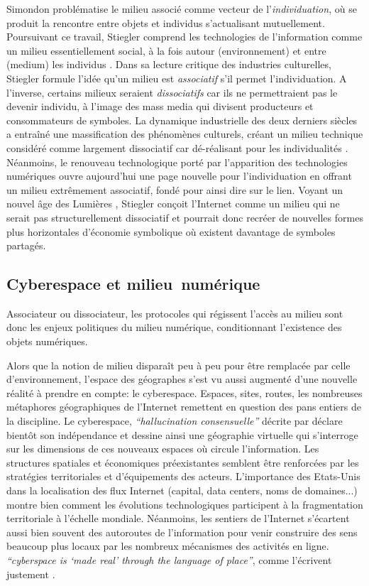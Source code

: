 Simondon problématise le milieu associé comme vecteur de l’\textit{individuation}, où se produit la rencontre entre objets et individus s'actualisant mutuellement. Poursuivant ce travail, Stiegler comprend les technologies de l’information comme un milieu essentiellement social, à la fois autour (environnement) et entre (medium) les individus \citep{Stiegler1998a}. Dans sa lecture critique des industries culturelles, Stiegler formule l’idée qu’un milieu est \textit{associatif} s’il permet l’individuation. A l’inverse, certains milieux seraient \textit{dissociatifs} car ils ne permettraient pas le devenir individu, à l’image des mass media qui divisent producteurs et consommateurs de symboles. La dynamique industrielle des deux derniers siècles a entraîné une massification des phénomènes culturels, créant un milieu technique considéré comme largement dissociatif car dé-réalisant pour les individualités \citep{Simondon1989}. Néanmoins, le renouveau technologique porté par l’apparition des technologies numériques ouvre aujourd’hui une page nouvelle pour l’individuation en offrant un milieu extrêmement associatif, fondé pour ainsi dire sur le lien. Voyant un nouvel âge des Lumières \citep{Stiegler2012}, Stiegler conçoit l’Internet comme un milieu qui ne serait pas structurellement dissociatif et pourrait donc recréer de nouvelles formes plus horizontales d’économie symbolique où existent davantage de symboles partagés. 

\subsection[Cyberespace et milieu numérique]{Cyberespace et milieu numérique}

Associateur ou dissociateur, les protocoles qui régissent l’accès au milieu sont donc les enjeux politiques du milieu numérique, conditionnant l’existence des objets numériques. 

Alors que la notion de milieu disparaît peu à peu pour être remplacée par celle d’environnement\citep{DAngio2001}, l’espace des géographes s'est vu aussi augmenté d’une nouvelle réalité à prendre en compte: le cyberespace. Espaces, sites, routes, les nombreuses métaphores géographiques de l'Internet remettent en question des pans entiers de la discipline. Le cyberespace, \textit{``hallucination consensuelle''} décrite par \cite{Gibson1984} déclare bientôt son indépendance \citep{Barlow2001} et dessine ainsi une géographie virtuelle \citep{Batty1997} qui s’interroge sur les dimensions de ces nouveaux espaces où circule l’information. Les structures spatiales et économiques préexistantes semblent être renforcées par les stratégies territoriales et d'équipements des acteurs. L’importance des Etats-Unis \citep{Zook2001, Cukier1999} dans la localisation des flux Internet (capital, data centers, noms de domaines...) montre bien comment les évolutions technologiques participent à la fragmentation territoriale à l’échelle mondiale. Néanmoins, les sentiers de l’Internet s’écartent aussi bien souvent des autoroutes de l’information pour venir construire des sens beaucoup plus locaux par les nombreux mécanismes des activités en ligne. \textit{``cyberspace is ‘made real’ through the language of place''}, comme l’écrivent justement \cite{Dodge2007}.

